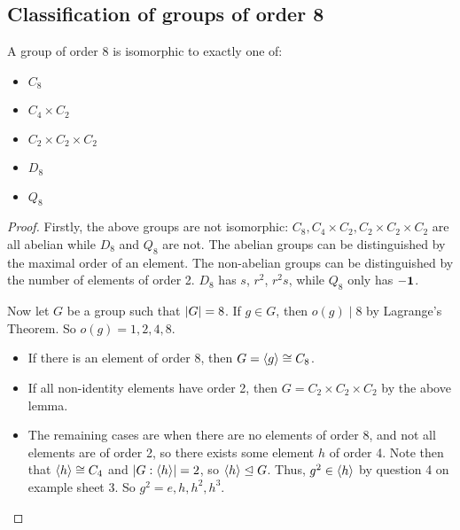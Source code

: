 \subsection{Classification of groups of order 8}
\begin{theorem}
	A group of order 8 is isomorphic to exactly one of:
	\begin{itemize}
		\item \(C_8\)
		\item \(C_4 \times C_2\)
		\item \(C_2 \times C_2 \times C_2\)
		\item \(D_8\)
		\item \(Q_8\)
	\end{itemize}
\end{theorem}
\begin{proof}
	Firstly, the above groups are not isomorphic: \(C_8, C_4 \times C_2, C_2 \times C_2 \times C_2\) are all abelian while \(D_8\) and \(Q_8\) are not.
	The abelian groups can be distinguished by the maximal order of an element.
	The non-abelian groups can be distinguished by the number of elements of order 2.
	\(D_8\) has \(s\), \(r^2\), \(r^2s\), while \(Q_8\) only has \(-\vb 1\).

	Now let \(G\) be a group such that \(\abs{G} = 8\).
	If \(g \in G\), then \(o(g) \mid 8\) by Lagrange's Theorem.
	So \(o(g) = 1, 2, 4, 8\).
	\begin{itemize}
		\item If there is an element of order 8, then \(G = \langle{} g \rangle \cong C_8\).
		\item If all non-identity elements have order 2, then \(G = C_2 \times C_2 \times C_2\) by the above lemma.
		\item The remaining cases are when there are no elements of order 8, and not all elements are of order 2, so there exists some element \(h\) of order 4.
		      Note then that \(\langle{} h \rangle \cong C_4\) and \(\abs{G:\langle{} h \rangle} = 2\), so \(\langle{} h \rangle \trianglelefteq G\).
		      Thus, \(g^2 \in \langle{} h \rangle\) by question 4 on example sheet 3.
		      So \(g^2 = e, h, h^2, h^3\).


\end{itemize}
\end{proof}
